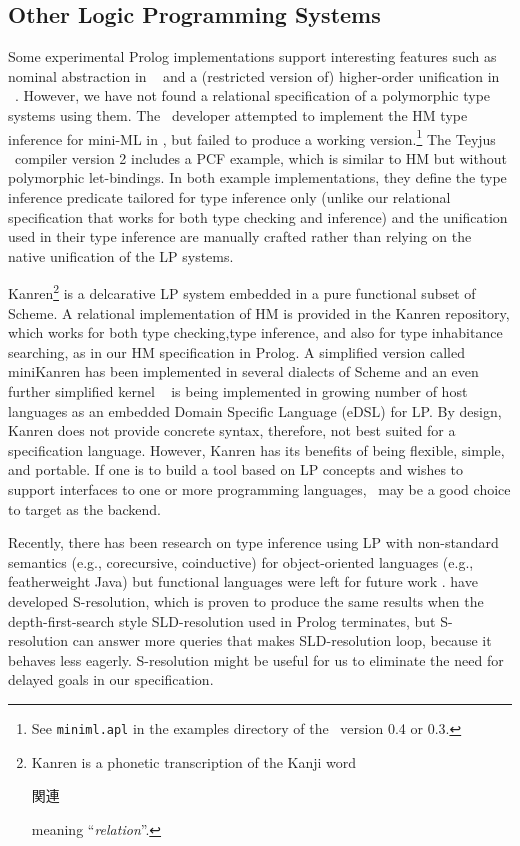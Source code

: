 \subsection{Other Logic Programming Systems}\label{ssec:otherLP}
Some experimental Prolog implementations support interesting features such as
nominal abstraction in \aProlog\ \cite{cheney04iclp} and a (restricted version
of) higher-order unification in \lProlog\ \cite{nadathur99cade}. However, we
have not found a relational specification of a polymorphic type systems using
them. The \aProlog\ developer attempted to implement the HM type inference for
mini-ML in \aProlog, but failed to produce a working version.\footnote{
	See \texttt{miniml.apl} in the examples directory of
	the \aProlog\ version 0.4 or 0.3.}
The Teyjus \lProlog\ compiler version 2 includes a PCF example,
which is similar to HM but without polymorphic let-bindings.
In both example implementations, they define the type inference predicate
tailored for type inference only (unlike our relational specification that
works for both type checking and inference) and the unification used in
their type inference are manually crafted rather than relying on
the native unification of the LP systems.

Kanren\footnote{ Kanren is a phonetic transcription of the Kanji word
	\begin{CJK}{UTF8}{min}{関連}\end{CJK} meaning ``\emph{relation}''.}
is a delcarative LP system embedded in a pure functional subset of Scheme.
A relational implementation of HM is provided in
the Kanren repository,
which works for both type checking,type inference, and also for
type inhabitance searching, as in our HM specification in Prolog.
A simplified version called miniKanren
has been implemented in several dialects of Scheme and an even further
simplified kernel \muKanren\ \cite{microKanren} is being implemented
in growing number of
host languages as an embedded Domain Specific Language (eDSL) for LP.
By design, Kanren does not provide concrete syntax, therefore, not best suited
for a specification language. However, Kanren has its benefits of being
flexible, simple, and portable. If one is to build a tool based on LP concepts
and wishes to support interfaces to one or more programming languages,
\muKanren\ may be a good choice to target as the backend.

Recently, there has been research on type inference using LP with non-standard
semantics (e.g., corecursive, coinductive) for object-oriented languages
(e.g., featherweight Java) but functional languages were left for
future work \cite{AL-ECOOP09}.
\citet{SRLP15} have developed S-resolution, which is proven \cite{PCR15} to
produce the same results when the depth-first-search style SLD-resolution
used in Prolog terminates, but S-resolution can answer more
queries that makes SLD-resolution loop, because it behaves less eagerly.
S-resolution might be useful for us to eliminate the need for delayed goals
in our specification.

